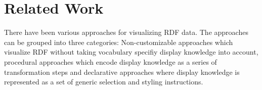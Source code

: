 \section{Related Work}










There have been various approaches for visualizing RDF data. The approaches can be grouped into three categories: Non-customizable approaches which visualize RDF without taking vocabulary specifiy display knowledge into account\cite{Steer03}, procedural approaches which encode display knowledge as a series of transformation steps and declarative approaches where display knowledge is represented as a set of generic selection and styling instructions. 

